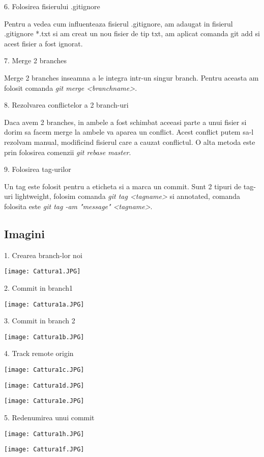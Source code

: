  6. Folosirea fisierului .gitignore
 
 Pentru a vedea cum influenteaza fisierul .gitignore, am adaugat in fisierul .gitignore *.txt si am creat un nou fisier de tip txt, am aplicat comanda git add si acest fisier a fost ignorat.
 
 7. Merge 2 branches
 
 Merge 2 branches inseamna a le integra intr-un singur branch. Pentru aceasta am folosit comanda \textit {git merge <branchname>}.
 
 8. Rezolvarea conflictelor a 2 branch-uri
 
 Daca avem 2 branches, in ambele a fost schimbat aceeasi parte a unui fisier si dorim sa facem merge la ambele va aparea un conflict. Acest conflict putem sa-l rezolvam manual, modificind fisierul care a cauzat conflictul. O alta metoda este prin folosirea comenzii \textit {git rebase master}. 
 
 9. Folosirea tag-urilor
 
 Un tag este folosit pentru a eticheta si a marca un commit. Sunt 2 tipuri de tag-uri lightweight, folosim comanda \textit {git tag <tagname>} si annotated, comanda folosita este \textit {git tag -am "message" <tagname>}.
 
 
\clearpage


\subsection{Imagini}



1. Crearea branch-lor noi

\texttt{[image: Cattura1.JPG]}

2. Commit in branch1

\texttt{[image: Cattura1a.JPG]}

\clearpage

3. Commit in branch 2

\texttt{[image: Cattura1b.JPG]}

4. Track remote origin

\texttt{[image: Cattura1c.JPG]}

\texttt{[image: Cattura1d.JPG]}

\texttt{[image: Cattura1e.JPG]}

5. Redenumirea unui commit

\texttt{[image: Cattura1h.JPG]}

\texttt{[image: Cattura1f.JPG]}

\clearpage

